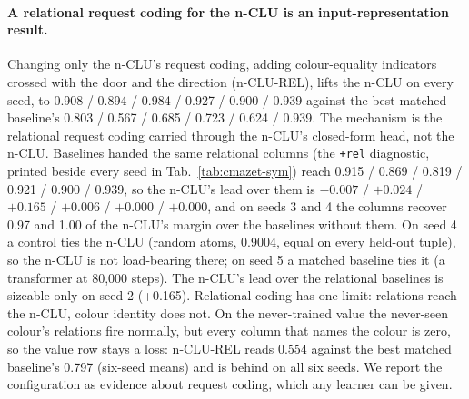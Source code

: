 \documentclass{article} %
\begin{document}
\paragraph{A relational request coding for the n-CLU is an input-representation result.} Changing only the
n-CLU's request coding, adding colour-equality indicators crossed with the door and the direction
(n-CLU-REL), lifts the n-CLU on every seed, to 0.908 / 0.894 / 0.984 / 0.927 / 0.900 / 0.939
against the best matched baseline's 0.803 / 0.567 / 0.685 / 0.723 / 0.624 / 0.939. The mechanism is the
relational request coding carried through the n-CLU's closed-form head, not the n-CLU. Baselines handed
the same relational columns (the \texttt{+rel} diagnostic, printed beside every seed in
Tab.~\ref{tab:cmazet-sym}) reach 0.915 / 0.869 / 0.819 / 0.921 / 0.900 / 0.939, so the n-CLU's lead
over them is $-0.007$ / $+0.024$ / $+0.165$ / $+0.006$ / $+0.000$ / $+0.000$, and on seeds 3 and 4 the
columns recover 0.97 and 1.00 of the n-CLU's margin over the baselines without them. On seed 4 a control
ties the n-CLU (random atoms, 0.9004, equal on every held-out tuple), so the n-CLU is not load-bearing
there; on seed 5 a matched baseline ties it (a transformer at 80,000 steps). The n-CLU's lead over the
relational baselines is sizeable only on seed 2 (+0.165). Relational coding has one limit: relations
reach the n-CLU, colour identity does not. On the never-trained value the never-seen colour's
relations fire normally, but every column that names the colour is zero, so the value row stays a
loss: n-CLU-REL reads 0.554 against the best matched baseline's 0.797 (six-seed means) and is %
behind on all six seeds. We report the configuration as evidence about
request coding, which any learner can be given.

\end{document}
